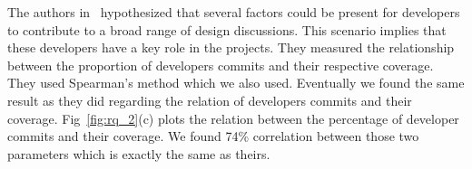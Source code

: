 The authors in~\cite{Brunet2014a} hypothesized that several factors could be present for developers to contribute to a broad range of design discussions. This scenario implies that these developers have a key role in the projects. They measured the relationship between the proportion of developers commits and their respective coverage. They used Spearman's method which we also used. Eventually we found the same result as they did regarding the relation of developers commits and their coverage. Fig~\ref{fig:rq_2}(c) plots the relation between the percentage of developer commits and their coverage. We found 74\% correlation between those two parameters which is exactly the same as theirs.     
   